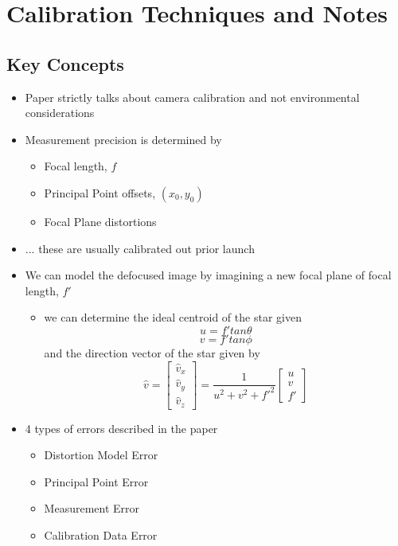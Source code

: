 \chapter{Calibration Techniques and Notes}
\section{Key Concepts\cite{novel_approach_for_calibration}}
\begin{itemize}
    \item Paper strictly talks about camera calibration and not environmental considerations
    \item Measurement precision is determined by 
    \begin{itemize}
        \item Focal length, $f$
        \item Principal Point offsets, $(x_0, y_0)$
        \item Focal Plane distortions
    \end{itemize}
    \item ... these are usually calibrated out prior launch
    \item We can model the defocused image by imagining a new focal plane of focal length, $f'$
    \begin{itemize}
        \item we can determine the ideal centroid of the star given 
        \[ u = f' tan\theta \]
        \[ v = f' tan\phi \]
        and the direction vector of the star given by 
        \[ \hat{v} = \begin{bmatrix}
            \hat{v}_x \\
            \hat{v}_y \\
            \hat{v}_z
        \end{bmatrix} = \frac{1}{u^2 + v^2 + f'^2} \begin{bmatrix}
            u \\
            v \\
            f'
        \end{bmatrix} \]
    \end{itemize}
    \item 4 types of errors described in the paper 
    \begin{itemize}
        \item Distortion Model Error
        \item Principal Point Error
        \item Measurement Error
        \item Calibration Data Error
    \end{itemize}
\end{itemize}

